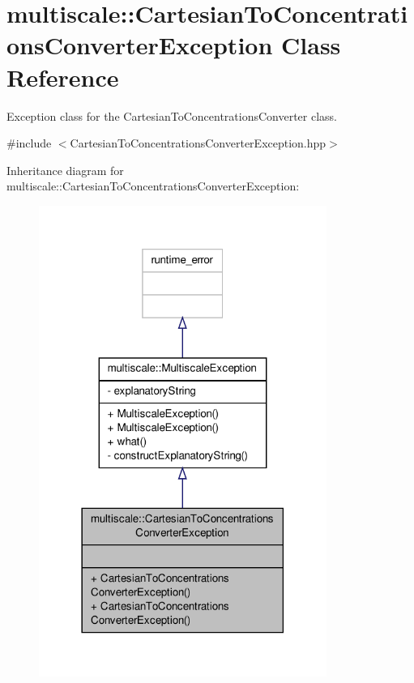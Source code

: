 \hypertarget{classmultiscale_1_1CartesianToConcentrationsConverterException}{\section{multiscale\-:\-:Cartesian\-To\-Concentrations\-Converter\-Exception Class Reference}
\label{classmultiscale_1_1CartesianToConcentrationsConverterException}
}


Exception class for the Cartesian\-To\-Concentrations\-Converter class.  




{\ttfamily \#include $<$Cartesian\-To\-Concentrations\-Converter\-Exception.\-hpp$>$}



Inheritance diagram for multiscale\-:\-:Cartesian\-To\-Concentrations\-Converter\-Exception\-:
\nopagebreak
\begin{figure}[H]
\begin{center}
\leavevmode
\includegraphics[width=266pt]{classmultiscale_1_1CartesianToConcentrationsConverterException__inherit__graph}
\end{center}
\end{figure}


